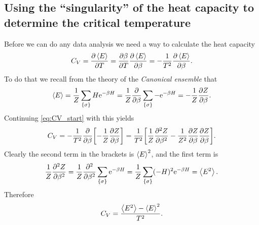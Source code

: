 \documentclass[11pt,letter, swedish, english
]{article}
\begin{document}
\subsection{Using the ``singularity'' of the heat capacity to determine the critical temperature}
Before we can do any data analysis we need a way to calculate the heat
capacity
\begin{equation}\label{eq:CV_start}
C_V = \pdv{\ev{E}}{T} = \pdv{\beta}{T}\pdv{\ev{E}}{\beta} 
= -\frac{1}{T^2}\pdv{\ev{E}}{\beta}.
\end{equation}
To do that we recall from the theory of the 
\emph{Canonical ensemble} that 
\begin{equation}
\ev{E} = \frac{1}{Z}\sum_{\{\sigma\}} H\ee^{-\beta H}
= \frac{1}{Z} \pdv{\beta}\sum_{\{\sigma\}} -\ee^{-\beta H}
= -\frac{1}{Z} \pdv{Z}{\beta}.
\end{equation}
Continuing \eqref{eq:CV_start} with this yields
\begin{equation}
C_V = -\frac{1}{T^2}\pdv{\beta}
\qty[-\frac{1}{Z} \pdv{Z}{\beta}]
=\frac{1}{T^2}\qty[
\frac{1}{Z} \pdv[2]{Z}{\beta}
-\frac{1}{Z^2} \pdv{Z}{\beta}\pdv{Z}{\beta}].
\end{equation}
Clearly the second term in the brackets is $\ev{E}^2$, and the first
term is
\begin{equation}
\frac{1}{Z} \pdv[2]{Z}{\beta}
=\frac{1}{Z} \pdv[2]{\beta}\sum_{\{\sigma\}} \ee^{-\beta H}
=\frac{1}{Z} \sum_{\{\sigma\}} (-H)^2 \ee^{-\beta H}
= \ev{E^2}.
\end{equation}
Therefore
\begin{equation}\label{eq:CV}
C_V = \frac{\ev{E^2}-\ev{E}^2}{T^2}.
\end{equation}

\end{document}
